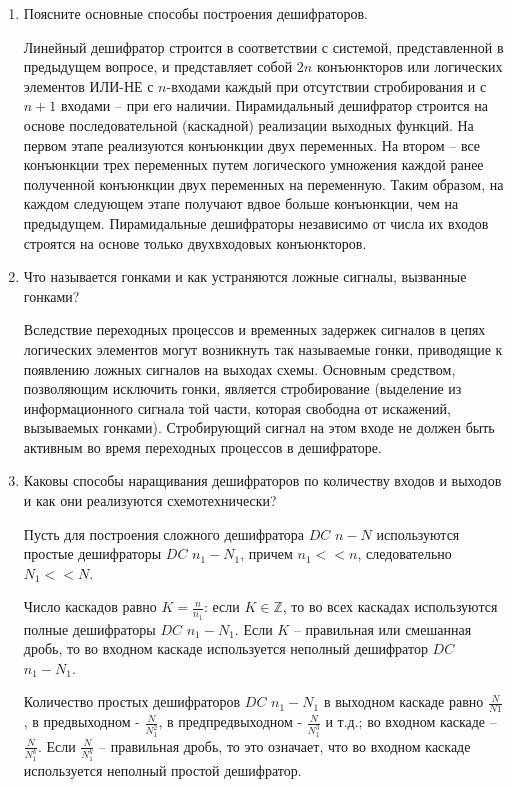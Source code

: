 \begin{enumerate}
	\item{Поясните основные способы построения дешифраторов.}

	Линейный дешифратор строится в соответствии с системой, представленной в предыдущем вопросе, и представляет собой $2n$ конъюнкторов или логических элементов ИЛИ-НЕ
	с $n$-входами каждый при отсутствии стробирования и с $n + 1$ входами -- при его наличии.
	Пирамидальный дешифратор строится на основе последовательной (каскадной) реализации выходных функций. На первом этапе реализуются конъюнкции двух переменных.
	На втором -- все конъюнкции трех переменных путем логического умножения каждой ранее полученной конъюнкции двух переменных на переменную. Таким образом, на каждом
	следующем этапе получают вдвое больше конъюнкции, чем на предыдущем. Пирамидальные дешифраторы независимо от числа их входов строятся на основе только двухвходовых конъюнкторов.
	
	\item{Что называется гонками и как устраняются ложные сигналы, вызванные гонками?}
	
	Вследствие переходных процессов и временных задержек сигналов в цепях логических элементов могут возникнуть так называемые гонки, приводящие к появлению ложных сигналов на выходах схемы. Основным средством, позволяющим исключить гонки, является стробирование (выделение из информационного сигнала той части, которая свободна от искажений, вызываемых гонками). Стробирующий сигнал на этом входе не должен
	быть активным во время переходных процессов в дешифраторе.
	
	\item{Каковы способы наращивания дешифраторов по количеству входов и выходов и как они реализуются схемотехнически?}
	
	Пусть для построения сложного дешифратора $DC$ $n - N$ используются простые дешифраторы $DC$ $n_1 - N_1$, причем $n_1 << n$, следовательно $N_1 << N$.
	
	Число каскадов равно $K = \frac{n}{n_1}$: если $K \in \mathbb{Z}$, то во всех каскадах используются полные дешифраторы $DC$ $n_1 - N_1$. Если $K$ -- правильная или смешанная дробь, то во входном каскаде используется неполный дешифратор $DC$ $n_1 - N_1$.
	
	Количество простых дешифраторов $DC$ $n_1-N_1$ в выходном каскаде равно $\frac{N}{N1}$, в предвыходном - $\frac{N}{N_1^2}$, в предпредвыходном - $\frac{N}{N_1^3}$ и т.д.; во входном каскаде -- $\frac{N}{N_1^k}$. Если $\frac{N}{N_1^k}$ -- правильная дробь, то это означает, что во входном каскаде используется неполный простой дешифратор.
	

\end{enumerate}
